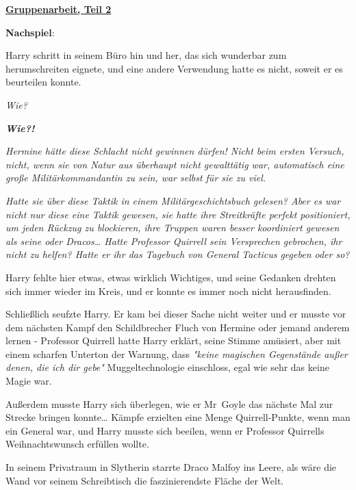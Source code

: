 

\hypertarget{gruppenarbeit-teil-2}{%

\textbf{\uline{Gruppenarbeit, Teil 2}}

\textbf{Nachspiel}:

Harry schritt in seinem Büro hin und her, das sich wunderbar zum herumschreiten eignete, und eine andere Verwendung hatte es nicht, soweit er es beurteilen konnte.

\emph{Wie?}

\textbf{\emph{Wie?!}}

\emph{Hermine hätte diese Schlacht nicht gewinnen dürfen! Nicht beim ersten Versuch, nicht, wenn sie von Natur aus überhaupt nicht gewalttätig war, automatisch eine große Militärkommandantin zu sein, war selbst für sie zu viel.}

\emph{\hfill\break Hatte sie über diese Taktik in einem Militärgeschichtsbuch gelesen? Aber es war nicht nur diese eine Taktik gewesen, sie hatte ihre Streitkräfte perfekt positioniert, um jeden Rückzug zu blockieren, ihre Truppen waren besser koordiniert gewesen als seine oder Dracos… Hatte Professor Quirrell sein Versprechen gebrochen, ihr nicht zu helfen? Hatte er ihr das Tagebuch von General Tacticus gegeben oder so?}

Harry fehlte hier etwas, etwas wirklich Wichtiges, und seine Gedanken drehten sich immer wieder im Kreis, und er konnte es immer noch nicht herausfinden.

Schließlich seufzte Harry. Er kam bei dieser Sache nicht weiter und er musste vor dem nächsten Kampf den Schildbrecher Fluch von Hermine oder jemand anderem lernen - Professor Quirrell hatte Harry erklärt, seine Stimme amüsiert, aber mit einem scharfen Unterton der Warnung, dass \emph{"keine magischen Gegenstände außer denen, die ich dir gebe"} Muggeltechnologie einschloss, egal wie sehr das keine Magie war.

Außerdem musste Harry sich überlegen, wie er Mr~Goyle das nächste Mal zur Strecke bringen konnte… Kämpfe erzielten eine Menge Quirrell-Punkte, wenn man ein General war, und Harry musste sich beeilen, wenn er Professor Quirrells Weihnachtswunsch erfüllen wollte.

In seinem Privatraum in Slytherin starrte Draco Malfoy ins Leere, als wäre die Wand vor seinem Schreibtisch die faszinierendste Fläche der Welt.

}
